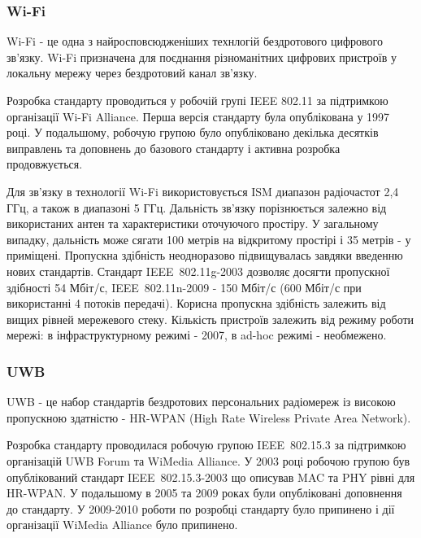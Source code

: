 \documentclass[a4paper,ukrainian,utf8,nocolumnsxix,floatsection]{eskdtext}
\renewcommand\paragraph{\subsubsection}
\begin{document}

\paragraph{Wi-Fi} %
\label{par:wi_fi}

Wi-Fi - це одна з найросповсюдженіших технлогій бездротового цифрового зв’язку. Wi-Fi призначена для поєднання різноманітних цифрових пристроїв у локальну мережу через бездротовий канал зв’язку. 

Розробка стандарту проводиться у робочій групі IEEE 802.11 за підтримкою організації Wi-Fi Alliance. Перша версія стандарту була опублікована у 1997 році. У подальшому, робочую групою було опубліковано декілька десятків виправлень та доповнень до базового стандарту і активна розробка продовжується.

Для зв’язку в технології Wi-Fi використовується ISM диапазон радіочастот 2,4 ГГц, а також в диапазоні 5 ГГц. Дальність зв’язку порізнюється залежно від використаних антен та характеристики оточуючого простіру. У загальному випадку, дальність може сягати 100 метрів на відкритому простірі і 35 метрів - у приміщені. Пропускна здібність неодноразово підвищувалась завдяки введенню нових стандартів. Стандарт IEEE~802.11g-2003 дозволяє досягти пропускної здібності 54 Мбіт/с, IEEE~802.11n-2009 - 150 Мбіт/с (600 Мбіт/с при використанні 4 потоків передачі). Корисна пропускна здібність залежить від вищих рівней мережевого стеку. Кількість пристроїв залежить від режиму роботи мережі: в інфраструктурному режимі - 2007, в ad-hoc режимі - необмежено.


\paragraph{UWB} %
\label{par:uwb}

UWB - це набор стандартів бездротових персональних радіомереж із високою пропускною здатністю - HR-WPAN (High Rate Wireless Private Area Network).

Розробка стандарту проводилася робочую групою IEEE~802.15.3 за підтримкою організацій UWB Forum та WiMedia Alliance. У 2003 році робочою групою був опублікований стандарт IEEE~802.15.3-2003 що описував MAC та PHY рівні для HR-WPAN. У подальшому в 2005 та 2009 роках були опубліковані доповнення до стандарту. У 2009-2010 роботи по розробці стандарту було припинено і дії організації WiMedia Alliance було припинено.
\end{document}
